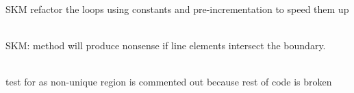 \begin{DoxyRefList}
\label{todo__todo000182}%
%
SKM refactor the loops using constants and pre-\/incrementation to speed them up 
\item[Member \doxylink{classcsmp_1_1_region_a18598313829c570b42ac839e9283f9bc}{csmp\+::Region\texorpdfstring{$<$}{<} dim \texorpdfstring{$>$}{>}\+::Surface\+Area} () const]\hfill \\
\label{todo__todo000183}%
%
SKM\+: method will produce nonsense if line elements intersect the boundary. 
\item[Member \doxylink{classcsmp_1_1_region___test_a8758bbbdf4e87a4aeef282d3fe504c1c}{csmp\+::Region\+\_\+\+Test\+::run} ()]\hfill \\
\label{todo__todo000264}%
%
test for  as non-\/unique region is commented out because rest of code is broken


\end{DoxyRefList}
